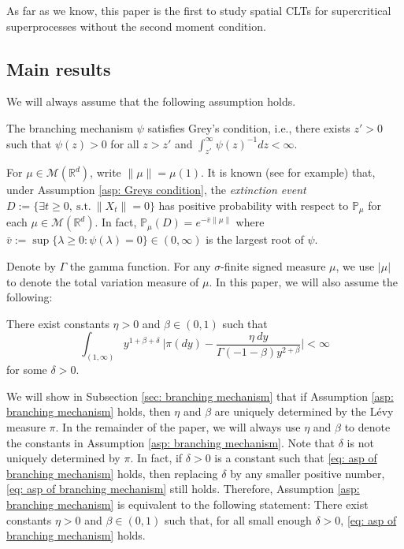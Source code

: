 \documentclass[EJP]{ejpecp} %
\begin{document}
	As far as we know, this paper is the first to study spatial CLTs for supercritical superprocesses without the second moment condition.

\subsection{Main results}
\label{sec:I:R}
	We will always assume that the following assumption holds.

\begin{assumption}
\label{asp: Greys condition}
	The branching mechanism $\psi$ satisfies Grey's condition, i.e., there exists $z' > 0$ such that $\psi(z) > 0$ for all $z>z'$ and  $\int_{z'}^\infty \psi(z)^{-1}dz < \infty$.
\end{assumption}

	For $\mu \in \mathcal M(\mathbb R^d)$, write $\|\mu\| = \mu(1)$.
	It is known (see \cite[Theorems 12.5 \& 12.7]{Kyprianou2014Fluctuations} for example) that, under Assumption \ref{asp: Greys condition}, the \emph{extinction event} $D :=\{\exists t\geq 0,~\text{s.t.}~ \|X_t\| =0 \}$ has positive probability with respect to $\mathbb P_\mu$ for each  $\mu \in \mathcal M(\mathbb R^d)$.
	In fact, $ \mathbb{P}_{\mu} (D) = e^{-\bar v \|\mu\|}$ where $ \bar v := \sup\{\lambda \geq 0: \psi(\lambda) = 0\} \in (0,\infty) $ is the largest root of $\psi$.

	Denote by $\Gamma$ the gamma function.
	For any $\sigma$-finite signed measure $\mu$, we use $|\mu|$ to denote the total variation measure of $\mu$.
	In this paper, we will also assume the following:

\begin{assumption}
\label{asp: branching mechanism}
	There exist constants $\eta > 0$ and $\beta \in (0,1)$ such that
\begin{equation}
\label{eq: asp of branching mechanism}
    \int_{(1,\infty)}y^{1+\beta +\delta}~\Big|\pi(dy)-\frac{\eta~dy}{\Gamma(-1-\beta)y^{2+\beta}}\Big| <\infty
\end{equation}  
	for some $\delta > 0$.
\end{assumption}

	We will show in Subsection \ref{sec: branching mechanism} that if Assumption \ref{asp: branching mechanism} holds, then $\eta$ and $\beta$ are uniquely determined by the L\'evy measure $\pi$.
   	In the remainder of the paper, we will always use $\eta$ and $\beta$ to denote the constants in Assumption  \ref{asp: branching mechanism}.
	Note that $\delta$ is not uniquely determined by $\pi$.
	In fact, if $\delta>0$ is a constant such that \eqref{eq: asp of branching mechanism} holds, then replacing $\delta$ by any smaller positive number, \eqref{eq: asp of branching mechanism} still holds.
	Therefore, Assumption \ref{asp: branching mechanism} is equivalent to the following statement:
	There exist constants $\eta > 0$ and $\beta \in (0,1)$ such that, for all small enough $\delta>0$, \eqref{eq: asp of branching mechanism} holds.
\end{document}
